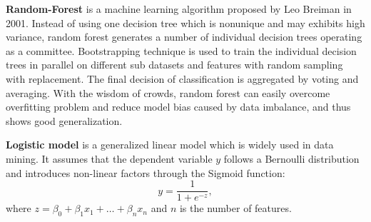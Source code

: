 \documentclass{article}
\begin{document}
\begin{comment}
Here are their formulas, assumes that the dataset has $C$ classes and $p_i$ is the probability of randomly select a sample of class $i$:
\begin{align*}
    \text{Information entropy (E):} \ \  E &= -\sum_{i}^C p_i \times log (p_i) \\
    \text{Gini Impurity (G):} \ \  G &= \sum_{i=1}^C p_i \times (1 - p_i)
\end{align*}
\end{comment}

\par\noindent\textbf{Random-Forest} is a machine learning algorithm proposed by Leo Breiman\cite{breiman2001random} in 2001. Instead of using one decision tree which is nonunique and may exhibits high variance, random forest generates a number of individual decision trees operating as a committee. Bootstrapping technique is used to train the individual decision trees in parallel on different sub datasets and features with random sampling with replacement. The final decision of classification is aggregated by voting and averaging. With the wisdom of crowds, random forest can easily overcome overfitting problem and reduce model bias caused by data imbalance, and thus shows good generalization. 


\begin{comment}
Following the bootstrap method, it randomly selects $k$ independent and identically distributed training subsets. Correspondingly, the random forest is constructed to generate $k$ different decision trees for different subsets. For each decision tree, it only uses a limited number of the features. These well-trained base classifiers can be used in predicting labels of testing set, by using the voting or averaging.

Because of its randomness and it is a combination of multiple Decision-Trees, it can overcome the problem that Decision-Tree is easily over-fitting. What's more, it can also reduce model bias caused by data imbalance to some extent.
\end{comment}

 
\par\noindent\textbf{Logistic model} is a generalized linear model which is widely used in data mining. It assumes that the dependent variable $y$ follows a Bernoulli distribution and introduces non-linear factors through the Sigmoid function:
$$    y = \frac{1}{1 + e^{-z}},$$ where  $z = \beta_0 + \beta_1 x_1 + \dots + \beta_n x_n$  and $n$ is the number of features.
 
\end{document}
